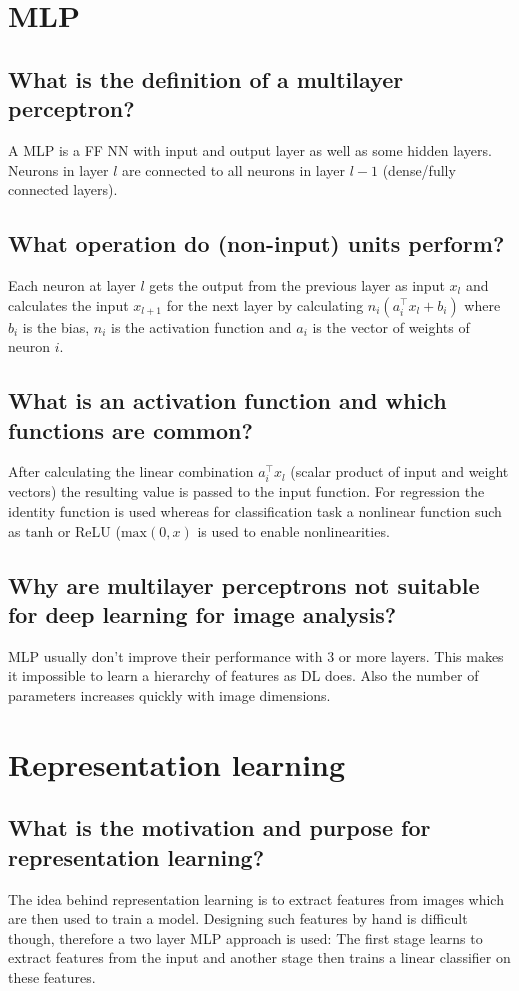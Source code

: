 \section{MLP}
\subsection{What is the definition of a multilayer perceptron?}
A MLP is a FF NN with input and output layer as well as some hidden layers. Neurons in layer $l$ are connected to all neurons in layer $l-1$ (dense/fully connected layers).
\subsection{What operation do (non-input) units perform?}
Each neuron at layer $l$ gets the output from the previous layer as input $x_l$ and calculates the input $x_{l+1}$ for the next layer by calculating $n_i(a_i^\top x_l + b_i)$ where $b_i$ is the bias, $n_i$ is the activation function and $a_i$ is the vector of weights of neuron $i$.
\subsection{What is an activation function and which functions are common?}
After calculating the linear combination $a_i^\top x_l$ (scalar product of input and weight vectors) the resulting value is passed to the input function. For regression the identity function is 	used whereas for classification task a nonlinear function such as $\mathrm{tanh}$ or ReLU ($\mathrm{max}(0,x)$ is used to enable nonlinearities.
\subsection{Why are multilayer perceptrons not suitable for deep learning for image analysis?}
MLP usually don't improve their performance with 3 or more layers. This makes it impossible to learn a hierarchy of features as DL does.
Also the number of parameters increases quickly with image dimensions.
%
\section{Representation learning}
\subsection{What is the motivation and purpose for representation learning?}
The idea behind representation learning is to extract features from images which are then used to train a model. Designing such features by hand is difficult though, therefore a two layer MLP approach is used: The first stage learns to extract features from the input and another stage then trains a linear classifier on these features.
